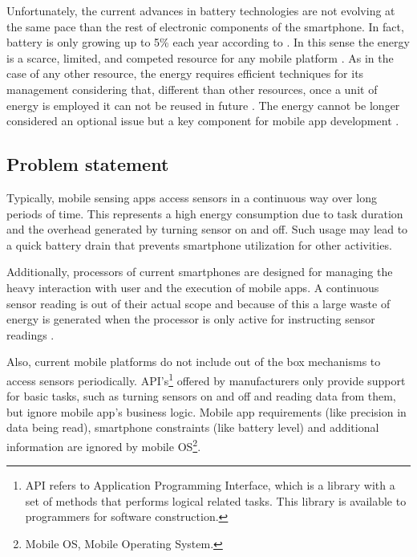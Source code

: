 Unfortunately, the current advances in battery technologies are not evolving at the same pace than the rest of electronic components \cite{Yurur2014} of the smartphone. In fact, battery is only growing up to 5\% each year according to \cite{Ma2012}.
In this sense the energy is a scarce, limited, and competed resource for any mobile platform \cite{Perez-Torres2012}.
As in the case of any other resource, the energy requires efficient techniques for its management considering that, different than other resources, once a unit of energy is employed it can not be reused in future \cite{Vallina-Rodriguez2013}.
The energy cannot be longer considered an optional issue but a key component for mobile app development \cite{Man2014}.

\subsection{Problem statement} 
\label{sub:problem_statement}
Typically, mobile sensing apps access sensors in a continuous way over long periods of time.
This represents a high energy consumption due to task duration and the overhead generated by turning sensor on and off. Such usage may lead to a quick battery drain that prevents smartphone utilization for other activities.

Additionally, processors of current smartphones are designed for managing the heavy interaction with user and the execution of mobile apps.
A continuous sensor reading is out of their actual scope and because of this a large waste of energy is generated when the processor is only active for instructing sensor readings \cite{Priyantha2011}.


Also, current mobile platforms do not include out of the box mechanisms to access sensors periodically.
API’s\footnote{API refers to Application Programming Interface, which is a library with a set of methods that performs logical related tasks. This library is available to programmers for software construction.} offered by manufacturers only provide support for basic tasks, such as turning sensors on and off and reading data from them, but ignore mobile app’s business logic.
Mobile app requirements (like precision in data being read), smartphone constraints (like battery level) and additional information are ignored by mobile OS\footnote{Mobile OS, Mobile Operating System.}.


